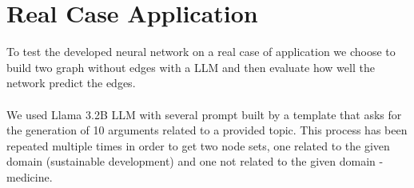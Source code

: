 \documentclass[11pt]{article}
\begin{document}
	\section{Real Case Application}
	To test the developed neural network on a real case of application we choose to build two graph without edges with a LLM and then evaluate how well the network predict the edges.\\\\
	We used Llama 3.2B LLM with several prompt built by a template that asks for the generation of 10 arguments related to a provided topic. This process has been repeated multiple times in order to get two node sets, one related to the given domain (sustainable development) and one not related to the given domain - medicine. 

%	
%	
%	
%	
%	
%	
\end{document}
